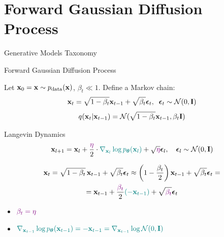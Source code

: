 \documentclass{beamer}
\begin{document}
\section{Forward Gaussian Diffusion Process}
\begin{frame}{Generative Models Taxonomy}
\end{frame}
\begin{frame}{Forward Gaussian Diffusion Process}

	Let $\mathbf{x}_0 = \mathbf{x} \sim p_{\text{data}}(\mathbf{x})$, $\beta_t \ll 1$. Define a Markov chain:
	\[
		\mathbf{x}_t = \sqrt{1 - \beta_t} \mathbf{x}_{t-1} + \sqrt{\beta_t} \boldsymbol{\epsilon}_t, \;\; \boldsymbol{\epsilon}_t \sim \mathcal{N}(0, \mathbf{I})
	\]
	\vspace{-0.5cm}
    \eqpause
	\[
		q(\mathbf{x}_t | \mathbf{x}_{t-1}) = \mathcal{N}(\sqrt{1 - \beta_t} \mathbf{x}_{t-1}, \beta_t \mathbf{I})
	\]
    \eqpause
	\vspace{-0.5cm}
	\begin{block}{Langevin Dynamics}
		\vspace{-0.3cm}
		\[
			\mathbf{x}_{l + 1} = \mathbf{x}_l + \frac{ \color{violet} \eta}{2} \cdot {\color{teal}\nabla_{\mathbf{x}_l} \log p_{\boldsymbol{\theta}}(\mathbf{x}_l)} + \sqrt{ \color{violet} \eta} \boldsymbol{\epsilon}_l, \quad \boldsymbol{\epsilon}_l \sim \mathcal{N}(0, \mathbf{I})
		\]
		\vspace{-0.5cm}
	\end{block}
    \eqpause
	\vspace{-0.7cm}
	\begin{multline*}
		\mathbf{x}_t = \sqrt{1 - \beta_t}\, \mathbf{x}_{t - 1} + \sqrt{\beta_t} \boldsymbol{\epsilon}_t \approx \left(1 - \frac{\beta_t}{2}\right)\mathbf{x}_{t-1} + \sqrt{\beta_t} \boldsymbol{\epsilon}_t = \\
		= \mathbf{x}_{t-1} + \frac{ \color{violet}  \beta_t}{2} {\color{teal} ( -\mathbf{x}_{t-1} )} + \sqrt{ \color{violet}  \beta_t} \boldsymbol{\epsilon}_t
	\end{multline*}
    \eqpause
	\vspace{-0.7cm}
	\begin{itemize}
		\item ${\color{violet} \beta_t = \eta }$
		\item ${\color{teal} \nabla_{\mathbf{x}_{t-1}}\log p_{\boldsymbol{\theta}}(\mathbf{x}_{t-1}) = - \mathbf{x}_{t-1} = \nabla_{\mathbf{x}_{t-1}} \log \mathcal{N}(0, \mathbf{I})}$
	\end{itemize}
 \end{frame}
\end{document}
